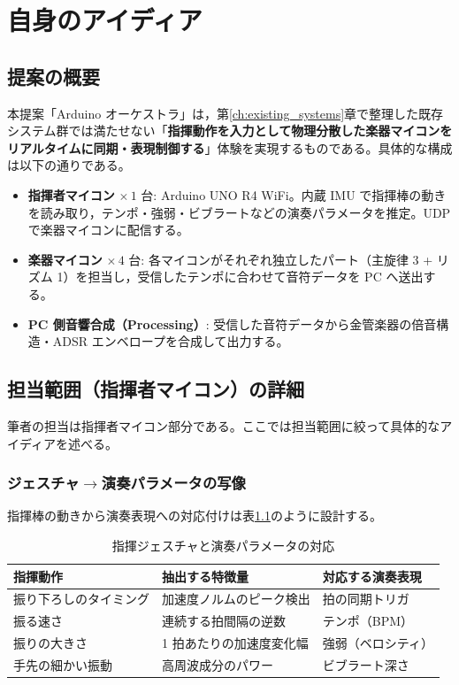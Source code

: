 \chapter{自身のアイディア}
\label{ch:idea}

\section{提案の概要}

本提案「Arduino オーケストラ」は，第\ref{ch:existing_systems}章で整理した既存システム群では満たせない「\textbf{指揮動作を入力として物理分散した楽器マイコンをリアルタイムに同期・表現制御する}」体験を実現するものである。具体的な構成は以下の通りである。

\begin{itemize}
  \item \textbf{指揮者マイコン} $\times\,1$ 台: Arduino UNO R4 WiFi。内蔵 IMU で指揮棒の動きを読み取り，テンポ・強弱・ビブラートなどの演奏パラメータを推定。UDP で楽器マイコンに配信する。
  \item \textbf{楽器マイコン} $\times\,4$ 台: 各マイコンがそれぞれ独立したパート（主旋律 3 + リズム 1）を担当し，受信したテンポに合わせて音符データを PC へ送出する。
  \item \textbf{PC 側音響合成（Processing）}: 受信した音符データから金管楽器の倍音構造・ADSR エンベロープを合成して出力する。
\end{itemize}

\section{担当範囲（指揮者マイコン）の詳細}

筆者の担当は指揮者マイコン部分である。ここでは担当範囲に絞って具体的なアイディアを述べる。

\subsection{ジェスチャ$\rightarrow$演奏パラメータの写像}

指揮棒の動きから演奏表現への対応付けは表\ref{tbl:mapping}のように設計する。

\begin{table}[H]
  \centering
  \caption{指揮ジェスチャと演奏パラメータの対応}
  \label{tbl:mapping}
  \begin{tabularx}{\textwidth}{l>{\small}X>{\small}X}
    \toprule
    指揮動作 & 抽出する特徴量 & 対応する演奏表現 \\
    \midrule
    振り下ろしのタイミング & 加速度ノルムのピーク検出 & 拍の同期トリガ \\
    振る速さ               & 連続する拍間隔の逆数     & テンポ（BPM） \\
    振りの大きさ           & 1 拍あたりの加速度変化幅 & 強弱（ベロシティ） \\
    手先の細かい振動       & 高周波成分のパワー       & ビブラート深さ \\
    \bottomrule
  \end{tabularx}
\end{table}

